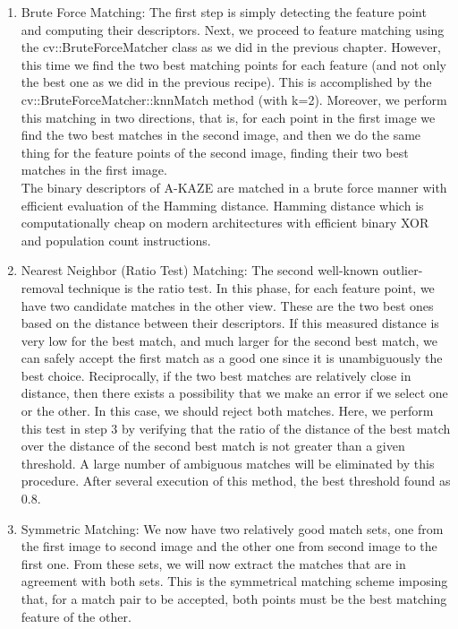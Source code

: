 \begin {enumerate}
  \item Brute Force Matching: The first step is simply detecting the feature point and computing their descriptors. Next, we proceed to feature matching using the cv::BruteForceMatcher class as we did in the previous chapter. However, this time we find the two best matching points for each feature (and not only the best one as we did in the previous recipe). This is accomplished by the cv::BruteForceMatcher::knnMatch method (with k=2). Moreover, we perform this matching in two directions, that is, for each point in the first image we find the two best matches in the second image, and then we do the same thing for the feature points of the second image, finding their two best matches in the first image.\\
  The binary descriptors of A-KAZE are matched in a brute force manner with efficient evaluation of the Hamming distance.
  Hamming distance which is computationally cheap on modern architectures with efficient binary XOR and population count instructions.
  \item Nearest Neighbor (Ratio Test) Matching: The second well-known outlier-removal technique is the ratio test. In this phase, for each feature point, we have two candidate matches in the other view. These are the two best ones based on the distance between their descriptors. If this measured distance is very low for the best match, and much larger for the second best match, we can safely accept the first match as a good one since it is unambiguously the best choice. Reciprocally, if the two best matches are relatively close in distance, then there exists a possibility that we make an error if we select one or the other. In this case, we should reject both matches. Here, we perform this test in step 3 by verifying that the ratio of the distance of the best match over the distance of the second best match is not greater than a given threshold. A large number of ambiguous matches will be eliminated by this procedure. After several execution of this method, the best threshold found as 0.8.
  \item Symmetric Matching: We now have two relatively good match sets, one from the first image to second image and the other one from second image to the first one. From these sets, we will now extract the matches that are in agreement with both sets. This is the symmetrical matching scheme imposing that, for a match pair to be accepted, both points must be the best matching feature of the other.

\end{enumerate}
